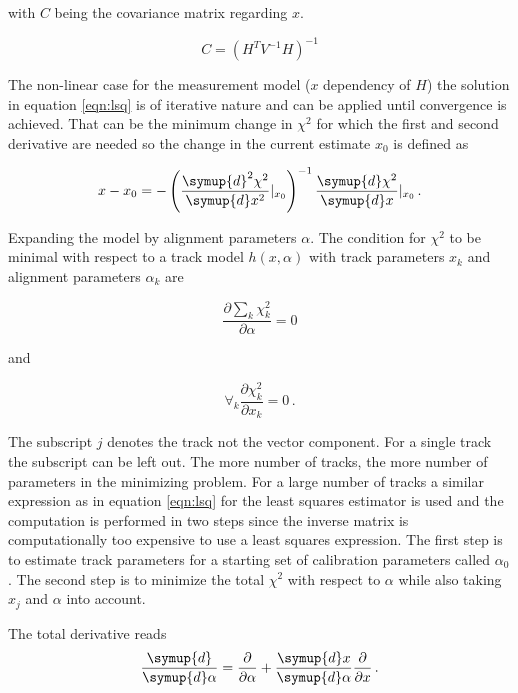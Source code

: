 with $C$ being the covariance matrix regarding $x$.

\begin{equation}
    C = \left( H^T V^{-1} H \right)^{-1}
    \label{eqn:cov}
\end{equation}

The non-linear case for the measurement model ($x$ dependency of $H$) the solution in equation \eqref{eqn:lsq} is of iterative nature and can be applied until convergence is achieved. That can be the minimum change in $\chi^2$ for which the first and second derivative are needed so the change in the current estimate $x_0$ is defined as

\begin{equation*}
    x - x_0 = -\left( \frac{\symup{d}^2\chi^2}{\symup{d}x^2}\vert_{x_0} \right)^{-1} \frac{\symup{d}\chi^2}{\symup{d}x}\vert_{x_0}\,.
\end{equation*}

Expanding the model by alignment parameters $\alpha$.
The condition for $\chi^2$ to be minimal with respect to a track model $h(x,\alpha)$ with track parameters $x_k$ and alignment parameters $\alpha_k$ are

\begin{equation}
  \frac{\partial\sum_k\chi^2_k}{\partial \alpha} = 0
\end{equation}

 and

 \begin{equation}
   \forall_k \frac{\partial\chi^2_k}{\partial x_k} = 0\,.
 \end{equation}

The subscript $j$ denotes the track not the vector component. For a single track the subscript can be left out. The more number of tracks, the more number of parameters in the minimizing problem.
For a large number of tracks a similar expression as in equation \eqref{eqn:lsq} for the least squares estimator is used and the computation is performed in two steps since the inverse matrix is computationally too expensive to use a least squares expression.
The first step is to estimate track parameters for a starting set of calibration parameters called $\alpha_0$. The second step is to minimize the total $\chi^2$ with respect to $\alpha$ while also taking $x_j$ and $\alpha$ into account.

The total derivative reads
\begin{equation}
  \frac{\symup{d}}{\symup{d}\alpha} = \frac{\partial}{\partial\alpha} +
  \frac{\symup{d}x}{\symup{d}\alpha}\frac{\partial}{\partial x}\,.
\end{equation}

